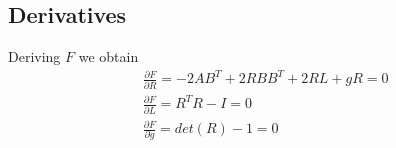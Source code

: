 \documentclass{report}
\begin{document}
\subsection{Derivatives}
Deriving $F$ we obtain
\begin{align}
    &\frac{\partial F}{\partial R} = -2AB^T + 2RBB^T + 2RL + gR = 0 \\
    &\frac{\partial F}{\partial L} =  R^TR - I = 0 \\
    &\frac{\partial F}{\partial g} =  det(R) - 1 = 0
\end{align}


\end{document}
